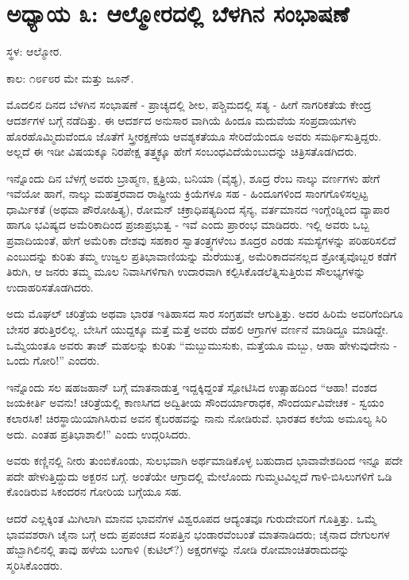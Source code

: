 
\chapter{ಅಧ್ಯಾಯ ೩: ಆಲ್ಮೋರದಲ್ಲಿ ಬೆಳಗಿನ ಸಂಭಾಷಣೆ}

ಸ್ಥಳ: ಆಲ್ಮೋರ.

ಕಾಲ: ೧೮೯೮ರ ಮೇ ಮತ್ತು ಜೂನ್.

ಮೊದಲಿನ ದಿನದ ಬೆಳಗಿನ ಸಂಭಾಷಣೆ - ಪ್ರಾಚ್ಯದಲ್ಲಿ ಶೀಲ, ಪಶ್ಚಿಮದಲ್ಲಿ ಸತ್ಯ - ಹೀಗೆ ನಾಗರಿಕತೆಯ ಕೇಂದ್ರ ಆದರ್ಶಗಳ ಬಗ್ಗೆ ನಡೆದಿತ್ತು. ಈ ಆದರ್ಶದ ಅನುಸಾರ ವಾಗಿಯೆ ಹಿಂದೂ ಮದುವೆಯ ಸಂಪ್ರದಾಯಗಳು ಹೊರಹೊಮ್ಮಿದುವೆಂದೂ ಜೊತೆಗೆ ಸ್ತ್ರೀರಕ್ಷಣೆಯ ಆವಶ್ಯಕತೆಯೂ ಸೇರಿದೆಯೆಂದೂ ಅವರು ಸಮರ್ಥಿಸುತ್ತಿದ್ದರು. ಅಲ್ಲದೆ ಈ ಇಡೀ ವಿಷಯಕ್ಕೂ ನಿರಪೇಕ್ಷ ತತ್ತ್ವಕ್ಕೂ ಹೇಗೆ ಸಂಬಂಧವಿದೆಯೆಂಬುದನ್ನು ಚಿತ್ರಿಸತೊಡಗಿದರು.

ಇನ್ನೊಂದು ದಿನ ಬೆಳಗ್ಗೆ ಅವರು ಬ್ರಾಹ್ಮಣ, ಕ್ಷತ್ರಿಯ, ಬನಿಯಾ (ವೈಶ್ಯ), ಶೂದ್ರ ರೆಂಬ ನಾಲ್ಕು ವರ್ಣಗಳು ಹೇಗೆ ಇವೆಯೋ ಹಾಗೆ, ನಾಲ್ಕು ಮಹತ್ತರವಾದ ರಾಷ್ಟ್ರೀಯ ಕ್ರಿಯೆಗಳೂ ಸಹ - ಹಿಂದೂಗಳಿಂದ ಸಾಂಗಗೊಳಿಸಲ್ಪಟ್ಟ ಧಾರ್ಮಿಕತೆ (ಅಥವಾ ಪೌರೋಹಿತ್ಯ), ರೋಮನ್ ಚಕ್ರಾಧಿಪತ್ಯದಿಂದ ಸೈನ್ಯ, ವರ್ತಮಾನದ ಇಂಗ್ಲೆಂಡ್ನಿಂದ ವ್ಯಾಪಾರ ಹಾಗೂ ಭವಿಷ್ಯದ ಅಮೆರಿಕಾದಿಂದ ಪ್ರಜಾಪ್ರಭುತ್ವ - ಇವೆ ಎಂದು ಪ್ರಾರಂಭ ಮಾಡಿದರು. ಇಲ್ಲಿ ಅವರು ಒಬ್ಬ ಪ್ರವಾದಿಯಂತೆ, ಹೇಗೆ ಅಮೆರಿಕಾ ದೇಶವು ಸಹಕಾರ ಸ್ವಾತಂತ್ರ್ಯಗಳೆಂಬ ಶೂದ್ರರ ಎರಡು ಸಮಸ್ಯೆಗಳನ್ನು ಪರಿಹರಿಸಲಿದೆ ಎಂಬುದನ್ನು ಕುರಿತು ತಮ್ಮ ಉಜ್ವಲ ಪ್ರತಿಭಾವಾಣಿಯನ್ನು ಮೆರೆಯುತ್ತ, ಅಮೆರಿಕಾದವನಲ್ಲದ ಶ್ರೋತೃವೊಬ್ಬರ ಕಡೆಗೆ ತಿರುಗಿ, ಆ ಜನರು ತಮ್ಮ ಮೂಲ ನಿವಾಸಿಗಳಿಗಾಗಿ ಉದಾರವಾಗಿ ಕಲ್ಪಿಸಿಕೊಡಲೆತ್ನಿಸುತ್ತಿರುವ ಸೌಲಭ್ಯಗಳನ್ನು ಉದಾಹರಿಸತೊಡಗಿದರು.

ಅದು ಮೊಘಲ್ ಚರಿತ್ರೆಯ ಅಥವಾ ಭಾರತ ಇತಿಹಾಸದ ಸಾರ ಸಂಗ್ರಹವೇ ಆಗುತ್ತಿತ್ತು. ಅದರ ಹಿರಿಮೆ ಅವರಿಗೆಂದಿಗೂ ಬೇಸರ ತರುತ್ತಿರಲಿಲ್ಲ. ಬೇಸಿಗೆ ಯುದ್ದಕ್ಕೂ ಮತ್ತೆ ಮತ್ತೆ ಅವರು ದೆಹಲಿ ಆಗ್ರಾಗಳ ವರ್ಣನೆ ಮಾಡಿದ್ದೂ ಮಾಡಿದ್ದೇ. ಒಮ್ಮೆಯಂತೂ ಅವರು ತಾಜ್ ಮಹಲನ್ನು ಕುರಿತು “ಮಬ್ಬುಮುಸುಕು, ಮತ್ತೆಯೂ ಮಬ್ಬು, ಆಹಾ ಹೇಳುವುದೇನು - ಒಂದು ಗೋರಿ!” ಎಂದರು.

ಇನ್ನೊಂದು ಸಲ ಷಹಜಹಾನ್ ಬಗ್ಗೆ ಮಾತನಾಡುತ್ತ ಇದ್ದಕ್ಕಿದ್ದಂತೆ ಸ್ಪೋಟಿಸಿದ ಉತ್ಸಾಹದಿಂದ “ಆಹಾ! ವಂಶದ ಜಯಕೀರ್ತಿ ಅವನು! ಚರಿತ್ರೆಯಲ್ಲಿ ಕಾಣಸಿಗದ ಅದ್ವಿತೀಯ ಸೌಂದರ್ಯಾರಾಧಕ, ಸೌಂದರ್ಯವಿವೇಚಕ - ಸ್ವಯಂ ಕಲಾರಸಿಕ! ಚಿರಸ್ಥಾಯಿಯಾಗಿಸಿರುವ ಅವನ ಕೈಬರಹವನ್ನು ನಾನು ನೋಡಿರುವೆ. ಭಾರತದ ಕಲೆಯ ಅಮೂಲ್ಯ ಸಿರಿ ಅದು. ಎಂತಹ ಪ್ರತಿಭಾಶಾಲಿ!” ಎಂದು ಉದ್ಗರಿಸಿದರು.

ಅವರು ಕಣ್ಣಿನಲ್ಲಿ ನೀರು ತುಂಬಿಕೊಂಡು, ಸುಲಭವಾಗಿ ಅರ್ಥಮಾಡಿಕೊಳ್ಳ ಬಹುದಾದ ಭಾವಾವೇಶದಿಂದ ಇನ್ನೂ ಪದೇ ಪದೇ ಹೇಳುತ್ತಿದ್ದುದು ಅಕ್ಬರನ ಬಗ್ಗೆ. ಅಂತೆಯೇ ಆಗ್ರಾದಲ್ಲಿ ಮೇಲೊಂದು ಗುಮ್ಮಟವಿಲ್ಲದೆ ಗಾಳಿ-ಬಿಸಿಲುಗಳಿಗೆ ಒಡಿ ಕೊಂಡಿರುವ ಸಿಕಂದರನ ಗೋರಿಯ ಬಗ್ಗೆಯೂ ಸಹ.

ಆದರೆ ಎಲ್ಲಕ್ಕಿಂತ ಮಿಗಿಲಾಗಿ ಮಾನವ ಭಾವನೆಗಳ ವಿಶ್ವರೂಪದ ಆದ್ಯಂತವೂ ಗುರುದೇವರಿಗೆ ಗೊತ್ತಿತ್ತು. ಒಮ್ಮೆ ಭಾವವಶರಾಗಿ ಚೈನಾ ಬಗ್ಗೆ ಅದು ಪ್ರಪಂಚದ ಸಂಪತ್ತಿನ ಭಂಡಾರವೆಂಬಂತೆ ಮಾತನಾಡಿದರು; ಚೈನಾದ ದೇಗುಲಗಳ ಹೆಬ್ಬಾಗಿಲಿನಲ್ಲಿ ತಾವು ಹಳೆಯ ಬಂಗಾಳಿ (ಕುಟಿಲ್?) ಅಕ್ಷರಗಳನ್ನು ನೋಡಿ ರೋಮಾಂಚಿತರಾದುದನ್ನು ಸ್ಮರಿಸಿಕೊಂಡರು.

